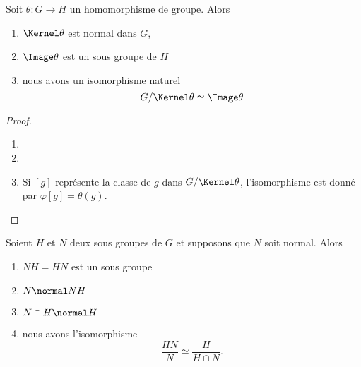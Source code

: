 \begin{theorem}        \label{ThoPremierthoisomo}
    Soit \( \theta\colon G\to H\) un homomorphisme de groupe. Alors
    \begin{enumerate}
        \item
            \( \Kernel\theta\) est normal dans \( G\),
        \item
            \( \Image \theta\) est un sous groupe de \( H\)
        \item   \label{ItemWLCLdk}
            nous avons un isomorphisme naturel
            \begin{equation}
                G/\Kernel\theta\simeq \Image\theta
            \end{equation}
    \end{enumerate}
\end{theorem}

\begin{proof}
    \begin{enumerate}
        \item
        \item
        \item
            Si \( [g]\) représente la classe de \( g\) dans \( G/\Kernel\theta\), l'isomorphisme est donné par \( \varphi[g]=\theta(g)\).
    \end{enumerate}
\end{proof}


\begin{theorem}
    Soient \( H\) et \( N\) deux sous groupes de \( G\) et supposons que \( N\) soit normal. Alors
    \begin{enumerate}
        \item
            \( NH=HN\) est un sous groupe
        \item
            \( N\normal NH\)
        \item
            \( N\cap H\normal H\)
        \item
            nous avons l'isomorphisme
            \begin{equation}
                \frac{ HN }{ N }\simeq\frac{ H }{ H\cap N }.
            \end{equation}
    \end{enumerate}
\end{theorem}

